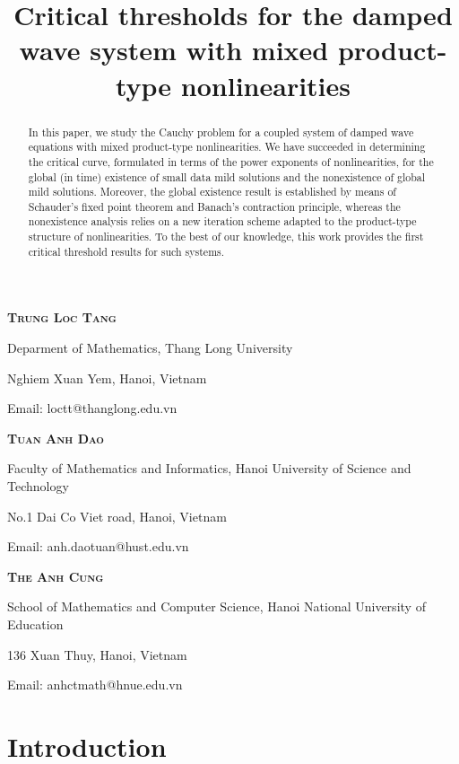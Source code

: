 \documentclass[11pt,reqno]{amsart}
\begin{document}
 
	\title[The damped wave system with mixed product-type nonlinearities]{Critical thresholds for the damped wave system with mixed product-type nonlinearities}
	\maketitle
	\centerline{\scshape \textbf{Trung Loc Tang}}
	{\footnotesize
		\centerline{Deparment of Mathematics, Thang Long University}
		\centerline{Nghiem Xuan Yem, Hanoi, Vietnam}
		\centerline{Email: loctt@thanglong.edu.vn}}
	
	\centerline{\scshape \textbf{Tuan Anh Dao}}
	{\footnotesize
		\centerline{Faculty of Mathematics and Informatics, Hanoi University of Science and Technology}
		\centerline{No.1 Dai Co Viet road, Hanoi, Vietnam}
		\centerline{Email: anh.daotuan@hust.edu.vn}}
	
	\centerline{\scshape \textbf{The Anh Cung}}
	{\footnotesize
		\centerline{School of Mathematics and Computer Science, Hanoi National University of Education}
		\centerline{136 Xuan Thuy, Hanoi, Vietnam}
		\centerline{Email: anhctmath@hnue.edu.vn}}
	
	\begin{abstract}
		In this paper, we study the Cauchy problem for a coupled system of damped wave equations with mixed product-type nonlinearities. We have succeeded in determining the critical curve, formulated in terms of the power exponents of nonlinearities, for the global (in time) existence of small data mild solutions and the nonexistence of global mild solutions. Moreover, the global existence result is established by means of Schauder's fixed point theorem and Banach's contraction principle, whereas the nonexistence analysis relies on a new iteration scheme adapted to the product-type structure of nonlinearities. To the best of our knowledge, this work provides the first critical threshold results for such systems.
	\end{abstract}
	
	\tableofcontents
	
	\section{Introduction}\label{sec1}
	
\end{document}
